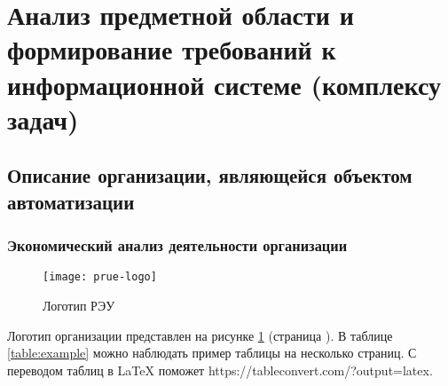 \documentclass[../thesis.tex]{subfiles}
\begin{document}
\section{Анализ предметной области и формирование требований к информационной системе (комплексу задач)}
\subsection{Описание организации, являющейся объектом автоматизации}
\subsubsection{Экономический анализ деятельности организации}

\begin{figure}[h!]
    \centering
    \texttt{[image: prue-logo]}
    \caption{Логотип РЭУ }
    \label{fig:prue:logo}
\end{figure}

Логотип организации представлен на рисунке \ref{fig:prue:logo} (страница \pageref{fig:prue:logo}). В таблице \ref{table:example} можно наблюдать пример таблицы на несколько страниц. С переводом таблиц в \LaTeX{} поможет https://tableconvert.com/?output=latex.
\end{document}
